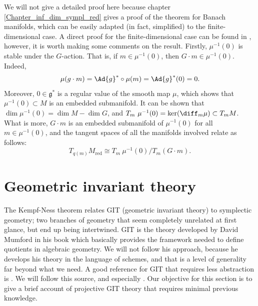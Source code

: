 We will not give a detailed proof here because chapter \ref{Chapter_inf_dim_sympl_red} gives a proof of the theorem for Banach manifolds, which can be easily adapted (in fact, simplified) to the finite-dimensional case. A direct proof for the finite-dimensional case can be found in \parencite[Part IX]{da2001lectures}, however, it is worth making some comments on the result. Firstly, \(\mu^{-1}(0)\) is stable under the \(G\)-action. That is, if \(m \in \mu^{-1}(0)\), then \(G \cdot m \in \mu^{-1}(0)\). Indeed, 
\begin{equation} \label{eq_mu_invariant_G_action}
\mu(g \cdot m)=\Ad{g}^* \circ \mu(m)=\Ad{g}^*(0)=0.
\end{equation}
Moreover, \(0 \in \mathfrak{g}^*\) is a regular value of the smooth map \(\mu\), which shows that \(\mu^{-1}(0) \subset M\) is an embedded submanifold. It can be shown that \(\dim \mu^{-1}(0)=\dim M - \dim G\), and \(T_m\ \mu^{-1}(0)=\ker (\diff_m\mu) \subset T_mM\). What is more, \(G \cdot m\) is an embedded submanifold of \(\mu^{-1}(0)\) for all \(m \in \mu^{-1}(0)\), and the tangent spaces of all the manifolds involved relate as follows:
\[
T_{q(m)} M_{\mathrm{red}} \cong T_m\ \mu^{-1}(0)/T_m(G \cdot m).
\]

\section{Geometric invariant theory}
The Kempf-Ness theorem relates GIT (geometric invariant theory) to symplectic geometry; two branches of geometry that seem completely unrelated at first glance, but end up being intertwined. GIT is the theory developed by David Mumford in his book \parencite{mumford1994geometric} which basically provides the framework needed to define quotients in algebraic geometry. We will not follow his approach, because he develops his theory in the language of schemes, and that is a level of generality far beyond what we need. A good reference for GIT that requires less abstraction is \parencite{hoskins}. We will follow this source, and especially \parencite{szekelyhidi2014introduction}. Our objective for this section is to give a brief account of projective GIT theory that requires minimal previous knowledge.

